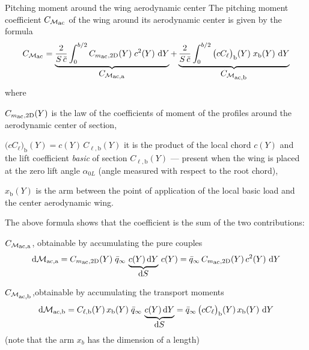 \documentclass[[12pt,twoside]{book}
\begin{document}
\begin{myExampleX}{Pitching moment around the wing aerodynamic center}{}
The pitching moment coefficient $C_{\mathcal{M}_\mathlarger{\mathrm{ac}}}$ of the wing
around its aerodynamic center is given by the formula
\[
C_{\mathcal{M}_\mathlarger{\mathrm{ac}}}
  = 
    \underbrace{%
      \frac{2}{S\,\bar{c}} \int_0^{b/2} C_{m_\mathlarger{\mathrm{ac}},\mathrm{2D}}(Y) \; c^2(Y)\, \diff{Y}
    }_{ \mathlarger{ C_{\mathcal{M}_\mathlarger{\mathrm{ac,a}}} } } 
    +
    \underbrace{%
      \frac{2}{S\,\bar{c}} \int_0^{b/2} \big(cC_{\ell}\big)_\mathrm{b}(Y) \; x_\mathrm{b}(Y)\, \diff{Y}
    }_{ \mathlarger{ C_{\mathcal{M}_\mathlarger{\mathrm{ac,b}}} } } 
\]
%
where 
\begin{compactenum}[{\color{gray}$\bullet$}]%
\item
$C_{m_\mathlarger{\mathrm{ac}},\mathrm{2D}}(Y)$ is the law of the coefficients of
moment of the profiles around the aerodynamic center of section,
\item
$\big(cC_{\ell}\big)_\mathrm{b}(Y) = c(Y) \, C_{\ell,\mathrm{b}} (Y)$ it is the product of the local chord
$c(Y)$ and the lift coefficient \emph{basic} of section
$C_{\ell,\mathrm{b}}(Y)$ --- present when
the wing is placed at the zero lift angle $\alpha_{0L}$ (angle measured with respect to the root chord),
\item
$x_\mathrm{b}(Y)$ is the arm between the point of application of the local basic load and the center
aerodynamic wing.
\end{compactenum}

The above formula shows that the coefficient 
is the sum of the two contributions:
\begin{compactenum}
\item
$C_{\mathcal{M}_\mathlarger{\mathrm{ac,a}}}$, obtainable by accumulating the pure couples 
  \[
    \diff{}\mathcal{M}_{\mathrm{ac},\mathrm{a}} 
      = C_{m_\mathlarger{\mathrm{ac}},\mathrm{2D}}(Y) \; \bar{q}_\infty \,
        \underbrace{%
          c(Y)\diff{Y}
        }_{ \mathlarger{ \diff{S} } }
          \, c(Y)
    = \bar{q}_\infty \, C_{m_\mathlarger{\mathrm{ac}},\mathrm{2D}}(Y) \, c^2(Y) \, \diff{Y} 
  \]
\item
$C_{\mathcal{M}_\mathlarger{\mathrm{ac,b}}}$,obtainable by accumulating the transport moments
  \[
    \diff{}\mathcal{M}_{\mathrm{ac},\mathrm{b}} 
      = C_{\ell,\mathrm{b}}(Y)\,x_\mathrm{b}(Y)\; \bar{q}_\infty \, 
        \underbrace{%
          c(Y)\diff{Y}
        }_{ \mathlarger{ \diff{S} } }
    = \bar{q}_\infty \, \big( cC_{\ell} \big)_\mathrm{b} (Y) \,x_\mathrm{b}(Y)\, \diff{Y}
  \]
\hfill(note that the arm $x_b$ has the dimension of a length)
\end{compactenum}


\end{myExampleX}
\end{document}
